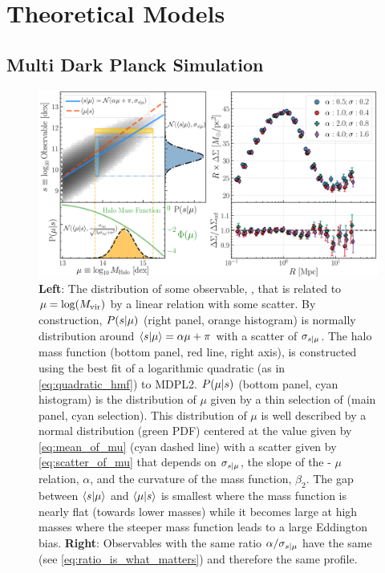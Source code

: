 \documentclass[a4paper,fleqn,usenatbib]{mnras}
\begin{document}
\section{Theoretical Models}
    \label{sec:model}

\subsection{Multi Dark Planck Simulation}

\begin{figure}
  \includegraphics[width=\textwidth]{figure/theory.png}
  \caption{
     \textbf{Left}: The distribution of some observable, \obsSym{}, that is related to $\mu =
     \log(M_{\rm vir})$ by a linear relation with some scatter. By construction, $P(s | \mu)$
     (right panel, orange histogram) is normally distribution around $\langle s | \mu
     \rangle = \alpha \mu + \pi$ with a scatter of $\sigma_{s | \mu}$. The halo mass
     function (bottom panel, red line, right axis), is constructed using the best fit of a
     logarithmic quadratic (as in \ref{eq:quadratic_hmf}) to MDPL2. $P(\mu | s)$ (bottom
     panel, cyan histogram) is the distribution of $\mu$ given by a thin selection of \obsSym{}
     (main panel, cyan selection). This distribution of $\mu$ is well described by a normal
     distribution (green PDF) centered at the value given by \ref{eq:mean_of_mu} (cyan dashed
     line) with a scatter given by \ref{eq:scatter_of_mu} that depends on $\sigma_{s |
     \mu}$, the slope of the \obsSym - $\mu$ relation, $\alpha$, and the curvature of the mass
     function, $\beta_2$. The gap between $\langle s | \mu \rangle$ and $\langle \mu |
     s \rangle$ is smallest where the mass function is nearly flat (towards lower masses)
     while it becomes large at high masses where the steeper mass function leads to a large
     Eddington bias. \textbf{Right}: Observables with the same ratio $\alpha /
     \sigma_{s{} | \mu{}}$ have the same \scatterMhaloObsSym{} (see
     \ref{eq:ratio_is_what_matters}) and therefore the same \dsigma{} profile.
	}
    \label{fig:theory}
\end{figure}
\end{document}
